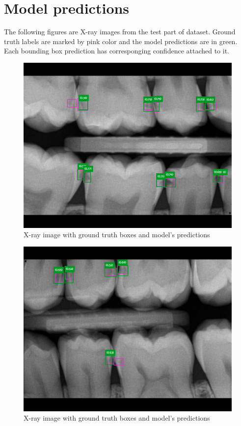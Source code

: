 \appendix


\chapter{Model predictions}
\label{appendix:model_predictions}
The following figures are X-ray images from the test part of dataset. Ground truth labels are marked by pink color and the model predictions are in green. Each bounding box prediction has corresponging confidence attached to it.
\begin{figure}
    \includegraphics[width=0.9\linewidth]{images/no_rest1.png}
    \caption{X-ray image with ground truth boxes and model's predictions}
    \label{fig:pred_img1}
\end{figure}

\begin{figure}
    \includegraphics[width=0.9\linewidth]{images/no_rest2.png}
    \caption{X-ray image with ground truth boxes and model's predictions}
    \label{fig:pred_img2}
\end{figure}

